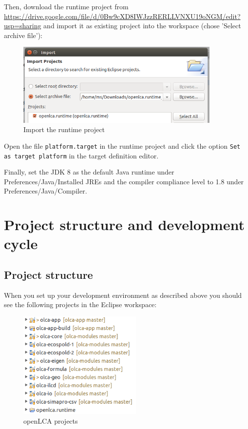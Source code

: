 \documentclass{scrreprt}
\begin{document}
Then, download the runtime project from \url{ https://drive.google.com/file/d/0Bw9cXD8IWJzzRERLLVNXU19oNGM/edit?usp=sharing} and import it as existing project into the workspace (chose 'Select archive file'):

\begin{figure}[H]
\centering
\includegraphics[width=0.9\textwidth]{images/eclipse_import_runtime.png}
\caption{Import the runtime project}
\end{figure}  

Open the file \texttt{platform.target} in the runtime project and click the option \texttt{Set as target platform} in the target definition editor.

Finally, set the JDK 8 as the default Java runtime under Preferences/Java/Installed JREs and the compiler compliance level to 1.8 under Preferences/Java/Compiler.

\chapter{Project structure and development cycle}

\section{Project structure}
When you set up your development environment as described above you should see the following projects in the Eclipse workspace:

\begin{figure}[H]
\centering
\includegraphics[height=200px]{images/structure_projects.png}
\caption{openLCA projects}
\end{figure} 
\end{document}
